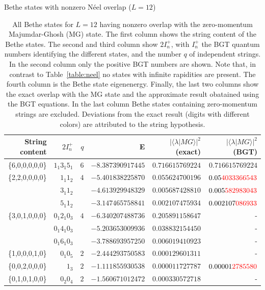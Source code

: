 \documentclass[11pt]{iopart}
\begin{document}
\begin{table}[h]
\scriptsize
\centering
Bethe states with nonzero N\'eel overlap ($L=12$)\\[1ex]
\begin{tabular}{rrrrrr}
\toprule
String content & $2I^+_n$ & $q$ & E & $|\langle\lambda|MG\rangle|^2$ (exact) & $|\langle\lambda|MG\rangle|^2$ (BGT) \\[0.3em]
\toprule
\{6,0,0,0,0,0\} &$1_1 3_1 5_1$ & $6$ & $-8.387390917445$ & $0.716615769224$ & $0.716615769224$\\
\midrule
\{2,2,0,0,0,0\} &$1_1 1_2$ & $4$ & $-5.401838225870$ & $0.055624700196$ & $0.05{\color{red}4033366543}$\\  
&$3_1 1_2 $ & & $-4.613929948329$ & $0.005687428810$ & $0.005{\color{red}582983043}$\\
&$5_1 1_2 $ &  & $-3.147465758841$ & $0.002107475934$ & $0.002107{\color{red}086933}$\\
\midrule
\{3,0,1,0,0,0\} &$0_1 2_1 0_3$ & $4$ & $-6.340207488736$ & $0.205891158647$ & -\\
  &$0_1 4_1 0_3$ & & $-5.203653009936$ & $0.038832154450$ & - \\
  &$0_1 6_1 0_3$ & & $-3.788693957250$ & $0.006019410923$ & - \\
\midrule
\{1,0,0,0,1,0\} &$0_1 0_5$ & $2$ & $-2.444293750583$ & $0.000129601311$ & - \\
\midrule
\{0,0,2,0,0,0\} &$1_3$ & $2$ & $-1.111855930538$ & $0.000011727787$ & $0.00001{\color{red}2785580}$\\
\midrule
\{0,1,0,1,0,0\} &$0_2 0_4$ & $2$ &  $-1.560671012472$ & $0.000330572718$ & - \\
\bottomrule
\end{tabular}
\caption{All Bethe states for $L=12$ having nonzero overlap with the zero-momentum Majumdar-Ghosh (MG) 
 state. The first column shows the string content of the Bethe states. The second and third column show 
 $2I_n^+$, with $I_n^+$ the BGT quantum numbers identifying the different states, and the number $q$ 
 of independent strings. In the second column only the positive BGT numbers are shown. Note that, in 
 contrast to Table~\ref{table:neel} no states with infinite rapidities are present. The fourth column 
 is the Bethe state eigenenergy. Finally, the last two columns show the exact overlap with the MG state 
 and the approximate result obatained using the BGT equations. In the last column Bethe states containing 
 zero-momentum strings are excluded. Deviations from the exact result (digits with different colors) 
 are attributed to the string hypothesis. 
}
\label{table:mg}
\end{table}
\end{document}
